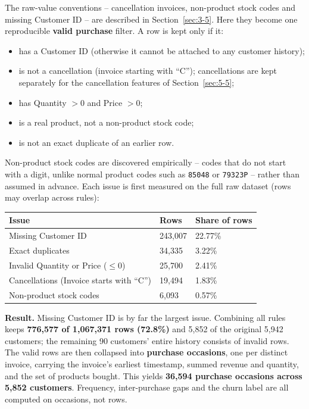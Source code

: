 The raw-value conventions -- cancellation invoices, non-product stock codes and missing Customer ID -- are described in Section~\ref{sec:3-5}. Here they become one reproducible \textbf{valid purchase} filter. A row is kept only if it:
\begin{itemize}
    \item has a Customer ID (otherwise it cannot be attached to any customer history);
    \item is not a cancellation (invoice starting with ``C''); cancellations are kept separately for the cancellation features of Section~\ref{sec:5-5};
    \item has Quantity $> 0$ and Price $> 0$;
    \item is a real product, not a non-product stock code;
    \item is not an exact duplicate of an earlier row.
\end{itemize}
Non-product stock codes are discovered empirically -- codes that do not start with a digit, unlike normal product codes such as \texttt{85048} or \texttt{79323P} -- rather than assumed in advance. Each issue is first measured on the full raw dataset (rows may overlap across rules):

\begin{center}
\begin{tabular}{@{}p{6cm}p{3.5cm}p{3.5cm}@{}}
    \toprule
    Issue & Rows & Share of rows \\
    \midrule
    Missing Customer ID & 243,007 & 22.77\% \\
    Exact duplicates & 34,335 & 3.22\% \\
    Invalid Quantity or Price ($\leq 0$) & 25,700 & 2.41\% \\
    Cancellations (Invoice starts with ``C'') & 19,494 & 1.83\% \\
    Non-product stock codes & 6,093 & 0.57\% \\
    \bottomrule
\end{tabular}
\end{center}

\textbf{Result.} Missing Customer ID is by far the largest issue. Combining all rules keeps \textbf{776,577 of 1,067,371 rows (72.8\%)} and 5,852 of the original 5,942 customers; the remaining 90 customers' entire history consists of invalid rows. The valid rows are then collapsed into \textbf{purchase occasions}, one per distinct invoice, carrying the invoice's earliest timestamp, summed revenue and quantity, and the set of products bought. This yields \textbf{36,594 purchase occasions across 5,852 customers}. Frequency, inter-purchase gaps and the churn label are all computed on occasions, not rows.

